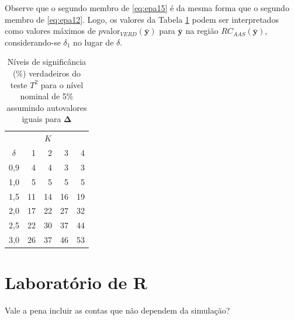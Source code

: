 \documentclass[]{book}
\numberwithin{example}{chapter}
\numberwithin{remark}{chapter}
\numberwithin{definition}{chapter}
\begin{document}
Observe que o segundo membro de \eqref{eq:epa15} é da mesma forma que o
segundo membro de \eqref{eq:epa12}. Logo, os valores da Tabela \ref{tab47}
podem ser interpretados como valores máximos de
\(p\)valor\(_{VERD}\left( \mathbf{\bar{y}}\right)\) para
\(\mathbf{\bar{y}}\) na região
\(RC_{AAS}\left(\mathbf{\bar{y}}\right)\), considerando-se
\(\delta_{1}\) no lugar de \(\delta\).

\begin{center}
\begin{table}[tbp] \centering
\caption{Níveis de significância (\%) verdadeiros do teste $T^{2}$
para o nível nominal de 5\% assumindo autovalores iguais 
para $\mathbf{\Delta}$}\bigskip \label{tab47}
\begin{tabular}{|c|cccc|}
\hline\hline
&  & $K$ &  &  \\ \cline{2-5}
$\delta $ & \multicolumn{1}{|r}{1} & \multicolumn{1}{r}{2} &
\multicolumn{1}{r}{3} & \multicolumn{1}{r|}{4} \\ \hline\hline
\multicolumn{1}{|r|}{0,9} & \multicolumn{1}{|r}{4} & \multicolumn{1}{r}{4} &
\multicolumn{1}{r}{3} & \multicolumn{1}{r|}{3} \\
\multicolumn{1}{|r|}{1,0} & \multicolumn{1}{|r}{5} & \multicolumn{1}{r}{5} &
\multicolumn{1}{r}{5} & \multicolumn{1}{r|}{5} \\
\multicolumn{1}{|r|}{1,5} & \multicolumn{1}{|r}{11} & \multicolumn{1}{r}{14}
& \multicolumn{1}{r}{16} & \multicolumn{1}{r|}{19} \\
\multicolumn{1}{|r|}{2,0} & \multicolumn{1}{|r}{17} & \multicolumn{1}{r}{22}
& \multicolumn{1}{r}{27} & \multicolumn{1}{r|}{32} \\
\multicolumn{1}{|r|}{2,5} & \multicolumn{1}{|r}{22} & \multicolumn{1}{r}{30}
& \multicolumn{1}{r}{37} & \multicolumn{1}{r|}{44} \\
\multicolumn{1}{|r|}{3,0} & \multicolumn{1}{|r}{26} & \multicolumn{1}{r}{37}
& \multicolumn{1}{r}{46} & \multicolumn{1}{r|}{53} \\ \hline\hline
\end{tabular}
\end{table}
\end{center}

\section{Laboratório de R}\label{laboratorio-de-r}

Vale a pena incluir as contas que não dependem da simulação?
\end{document}
